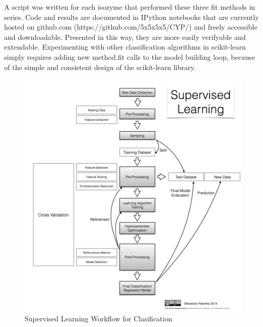 A script was written for each isozyme that performed these three fit methods in series. Code and results are documented in IPython notebooks that are currently hosted on github.com (https://github.com/5x5x5x5/CYP/) and freely accessible and downloadable. Presented in this way, they are more easily verifyable and extendable. Experimenting with other classification algorithms in scikit-learn simply requires adding new method.fit calls to the model building loop, because of the simple and consistent design of the scikit-learn library.


\begin{figure}[!htbp]
  \centering
  \includegraphics[width=1\textwidth]{../img/supervised_learning_flowchart.png}
  \caption{Supervised Learning Workflow for Clasification}
\end{figure}
